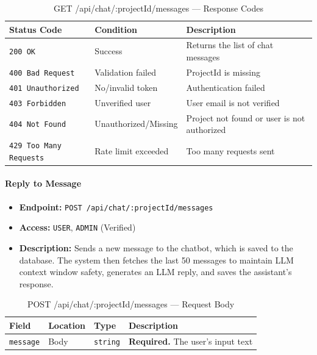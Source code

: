 \begin{table}[H]
\centering
\renewcommand{\arraystretch}{1.3}
\begin{tabularx}{\textwidth}{|l|l|X|}
\hline
\textbf{Status Code} & \textbf{Condition} & \textbf{Description} \\
\hline
\texttt{200 OK}           & Success            & Returns the list of chat messages \\
\hline
\texttt{400 Bad Request}  & Validation failed  & ProjectId is missing \\
\hline
\texttt{401 Unauthorized} & No/invalid token   & Authentication failed \\
\hline
\texttt{403 Forbidden}    & Unverified user    & User email is not verified \\
\hline
\texttt{404 Not Found}    & Unauthorized/Missing & Project not found or user is not authorized \\
\hline
\texttt{429 Too Many Requests} & Rate limit exceeded & Too many requests sent \\
\hline
\end{tabularx}
\caption{GET /api/chat/:projectId/messages — Response Codes}
\label{tab:get-chat-messages-responses}
\end{table}
\FloatBarrier

\paragraph{Reply to Message}
\label{subsubsec:reply-to-message}

\begin{itemize}
  \item \textbf{Endpoint:} \texttt{POST /api/chat/:projectId/messages}
  \item \textbf{Access:} \texttt{USER}, \texttt{ADMIN} (Verified)
  \item \textbf{Description:} Sends a new message to the chatbot, which is saved to the database. The system then fetches the last 50 messages to maintain LLM context window safety, generates an LLM reply, and saves the assistant's response.
\end{itemize}

\begin{table}[H]
\centering
\renewcommand{\arraystretch}{1.3}
\begin{tabularx}{\textwidth}{|l|l|l|X|}
\hline
\textbf{Field} & \textbf{Location} & \textbf{Type} & \textbf{Description} \\
\hline
\texttt{message} & Body & \texttt{string} & \textbf{Required.} The user's input text \\
\hline
\end{tabularx}
\caption{POST /api/chat/:projectId/messages — Request Body}
\label{tab:reply-to-message-body}
\end{table}

